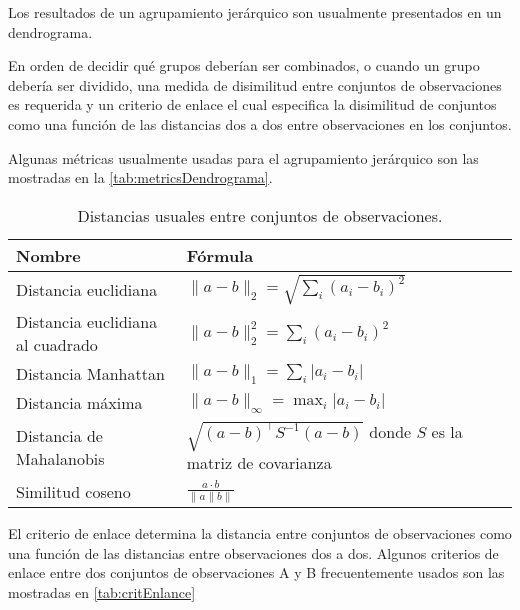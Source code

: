 Los resultados de un agrupamiento jerárquico son usualmente presentados en un dendrograma. 

En orden de decidir qué grupos deberían ser combinados, o cuando un grupo debería ser dividido, una medida de disimilitud entre conjuntos de observaciones es requerida y un criterio de enlace el cual especifica la disimilitud de conjuntos como una función de las distancias dos a dos entre observaciones en los conjuntos.

Algunas métricas usualmente usadas para el agrupamiento jerárquico son las mostradas en la \autoref{tab:metricsDendrograma}.

\begin{table}[h]
	\centering
	\begin{tabular}{m{6cm} m{6cm}  }
		\toprule
		\textbf{Nombre} & \textbf{Fórmula}\\
		\midrule
		 Distancia euclidiana & $\|a-b\|_{2}=\sqrt{\sum_{i}\left(a_{i}-b_{i}\right)^{2}}$\\
		\hline 
		Distancia euclidiana al cuadrado & $\|a-b\|_{2}^{2}=\sum_{i}\left(a_{i}-b_{i}\right)^{2}$ \\
		\hline 
		Distancia Manhattan & $\|a-b\|_{1}=\sum_{i}\left|a_{i}-b_{i}\right|$ \\
		\hline 
		Distancia máxima & $\|a-b\|_{\infty}=\max _{i}\left|a_{i}-b_{i}\right|$ \\
		\hline 
		Distancia de Mahalanobis & $\sqrt{(a-b)^{\top} S^{-1}(a-b)}$ donde $S$ es la matriz de covarianza \\
		\hline 
		Similitud coseno & $\frac{a \cdot b}{\|a\| b \|}$ \\
		\bottomrule
		\hline
	\end{tabular}
	\caption{Distancias usuales entre conjuntos de observaciones.}
	\label{tab:metricsDendrograma}
\end{table}



El criterio de enlace determina la distancia entre conjuntos de observaciones como una función de las distancias entre observaciones dos a dos. Algunos criterios de enlace entre dos conjuntos de observaciones A y B frecuentemente usados son las mostradas en \autoref{tab:critEnlance}

